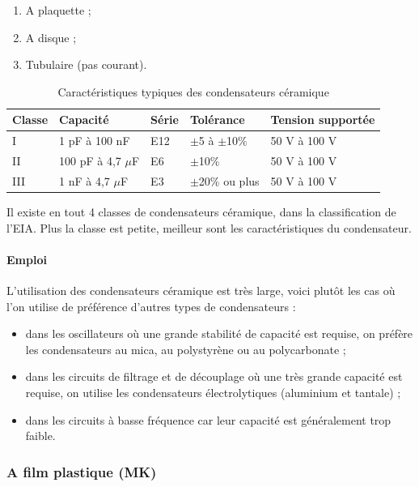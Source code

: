 \documentclass[a4paper]{article}
\begin{document}
\begin{enumerate}
	\item A plaquette ;
	\item A disque ;
	\item Tubulaire (pas courant).
\end{enumerate}

\begin{table}[H]
	\centering
		\begin{tabular}{|l|l|l|l|l|}\hline
				Classe & Capacité & Série & Tolérance & Tension supportée\\\hline\hline
				I & 1 pF à 100 nF & E12 & $\pm$5 à $\pm$10\% & 50 V à 100 V\\\hline
				II & 100 pF à 4,7 $\mu$F & E6 & $\pm$10\% & 50 V à 100 V\\\hline
				III & 1 nF à 4,7 $\mu$F & E3 & $\pm$20\% ou plus & 50 V à 100 V\\\hline
		\end{tabular}
		\caption{Caractéristiques typiques des condensateurs céramique
			\label{Caracteristiques_des_condensateurs_ceramique}}
\end{table}

Il existe en tout 4 classes de condensateurs céramique, dans la classification de l'\ac{EIA}. Plus la classe est petite, meilleur sont les caractéristiques du condensateur.

\paragraph{Emploi}

L'utilisation des condensateurs céramique est très large, voici plutôt les cas où l'on utilise de préférence d'autres types de condensateurs :

\begin{itemize}
	\item dans les oscillateurs où une grande stabilité de capacité est requise, on préfère les condensateurs au mica, au polystyrène ou au polycarbonate ;
	\item dans les circuits de filtrage et de découplage où une très grande capacité est requise, on utilise les condensateurs électrolytiques (aluminium et tantale) ;
	\item dans les circuits à basse fréquence car leur capacité est généralement trop faible.
\end{itemize}

\subsubsection{A film plastique (MK)}
\end{document}
